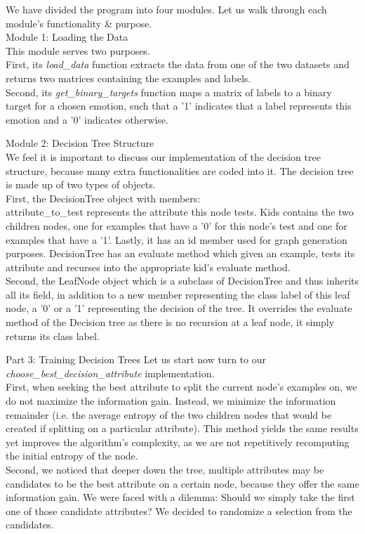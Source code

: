 
We have divided the program into four modules. Let us walk through each module's functionality & purpose.\\

Module 1: Loading the Data \\
This module serves two purposes.\\
First, its \emph{load\_data} function extracts the data from one of the two datasets
and returns two matrices containing the examples and labels. \\
Second, its \emph{get\_binary\_targets} function maps a matrix of labels to a binary target for a chosen emotion,
such that a '1' indicates that a label represents this emotion and a '0' indicates otherwise.

Module 2: Decision Tree Structure \\
We feel it is important to discuss our implementation of the decision tree structure,
because many extra functionalities are coded into it. The decision tree is made up of two types of objects.\\
First, the DecisionTree object with members:\\
attribute\_to\_test represents the attribute this node tests. Kids contains the two children nodes, one for
examples that have a '0' for this node's test and one for examples that have a '1'. Lastly, it has an id member used for graph
generation purposes. DecisionTree has an evaluate method which given an example, tests its attribute and recurses into
the appropriate kid's evaluate method. \\
Second, the LeafNode object which is a subclass of DecisionTree and thus inherits all its field, in addition to a new
member representing the class label of this leaf node, a '0' or a '1' representing the decision of the tree.
It overrides the evaluate method of the Decision tree as there is no recursion at a leaf node, it simply returns its class label.




Part 3: Training Decision Trees
Let us start now turn to our \emph{choose\_best\_decision\_attribute} implementation. \\
First, when seeking the best attribute to split the current node's examples on, we do not maximize the information gain.
Instead, we minimize the information remainder (i.e. the average entropy of the two children nodes
that would be created if splitting on a particular attribute).
This method yields the same results yet
improves the algorithm's complexity, as we are not repetitively recomputing the initial entropy of the node.\\
Second, we noticed that deeper down the tree, multiple attributes may be candidates to be the best attribute on a certain node,
because they offer the same information gain. We were faced with a dilemma: Should we simply
take the first one of those candidate attributes? We decided to randomize a selection from the candidates.

